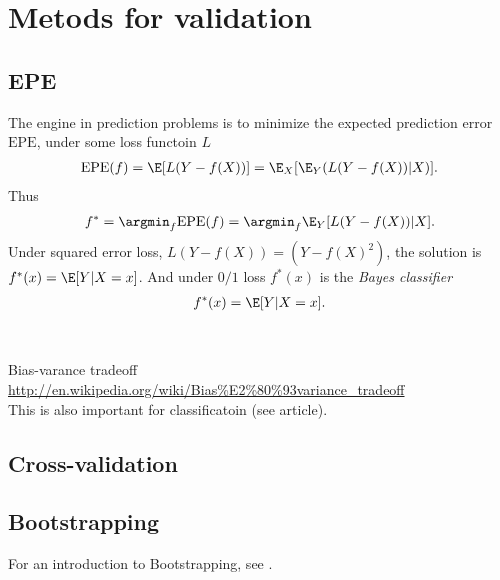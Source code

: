 \section{Metods for validation}
\label{sec:Metods for validation}
\subsection{EPE}
\label{sub:EPE}
The engine in prediction problems is to minimize the expected prediction error $\mathrm{EPE}$, under some loss functoin $L$
\begin{align}
  \mathrm{EPE}(f) = \E[L(Y-f(X))] = \E_X [\E_Y (L(Y-f(X))|X)].
\end{align}
Thus 
\begin{align}
  f^* = \argmin_f \mathrm{EPE}(f) = \argmin_f \E_Y [L(Y-f(X)) | X ].
\end{align}
Under squared error loss, $L(Y-f(X)) = (Y-f(X)^2)$, the solution is 
$f^*(x) = \E[Y | X=x]$. And under $0/1$ loss $f^*(x)$ is the \textit{Bayes classifier} 
\begin{align}
  f^*(x) = \E[Y | X=x].
\end{align}
\\
\\Bias-varance tradeoff \url{http://en.wikipedia.org/wiki/Bias%E2%80%93variance_tradeoff} \\
This is also important for classificatoin (see article).

\subsection{Cross-validation}
\label{sub:Cross-validation}

\subsection{Bootstrapping}
\label{sub:Bootstrapping}
For an introduction to Bootstrapping, see \cite{efron1994bootstrap}.

